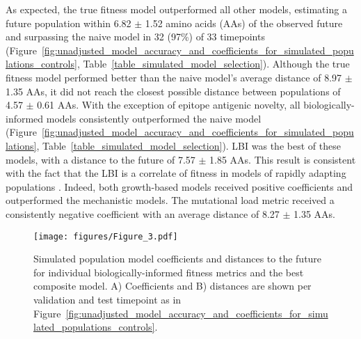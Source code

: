 As expected, the true fitness model outperformed all other models, estimating a future population within 6.82 $\pm$ 1.52 amino acids (AAs) of the observed future and surpassing the naive model in 32 (97\%) of 33 timepoints (Figure~\ref{fig:unadjusted_model_accuracy_and_coefficients_for_simulated_populations_controls}, Table~\ref{table_simulated_model_selection}).
Although the true fitness model performed better than the naive model's average distance of 8.97 $\pm$ 1.35 AAs, it did not reach the closest possible distance between populations of 4.57 $\pm$ 0.61 AAs.
With the exception of epitope antigenic novelty, all biologically-informed models consistently outperformed the naive model (Figure~\ref{fig:unadjusted_model_accuracy_and_coefficients_for_simulated_populations}, Table~\ref{table_simulated_model_selection}).
LBI was the best of these models, with a distance to the future of 7.57 $\pm$ 1.85 AAs.
This result is consistent with the fact that the LBI is a correlate of fitness in models of rapidly adapting populations \citep{Neher:2014eu}.
Indeed, both growth-based models received positive coefficients and outperformed the mechanistic models.
The mutational load metric received a consistently negative coefficient with an average distance of 8.27 $\pm$ 1.35 AAs.

\begin{figure}[htb]
  \texttt{[image: figures/Figure\_3.pdf]}
  \caption{
    Simulated population model coefficients and distances to the future for individual biologically-informed fitness metrics and the best composite model.
    A) Coefficients and B) distances are shown per validation and test timepoint as in Figure~\ref{fig:unadjusted_model_accuracy_and_coefficients_for_simulated_populations_controls}.
  }
  \label{fig:unadjusted_model_accuracy_and_coefficients_for_simulated_populations}

  \label{figsupp:unadjusted_composite_model_accuracy_and_coefficients_for_simulated_populations}

\end{figure}

